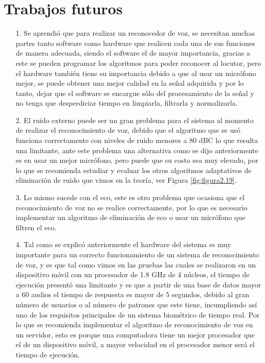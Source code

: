 \section{Trabajos futuros}
\begin{enumerate}
\item[1.]Se aprendió que para realizar un reconocedor de voz, se necesitan muchas partes tanto software como hardware que realicen cada una de sus funciones de manera adecuada, siendo el software el de mayor importancia, gracias a este se pueden programar los algoritmos para poder reconocer al locutor, pero el hardware también tiene su importancia debido a que al usar un micrófono mejor, se puede obtener una mejor calidad en la señal adquirida y por lo tanto, dejar que el software se encargue sólo del procesamiento de la señal y no tenga que desperdiciar tiempo en limpiarla, filtrarla y normalizarla.

\item[2.]El ruido externo puede ser un gran problema para el sistema al momento de realizar el reconocimiento de voz, debido que el algoritmo que se usó funciona correctamente con niveles de ruido menores a 80 dBC lo que resulta una limitante, ante este problema una alternativa como se dijo anteriormente es en usar un mejor micrófono, pero puede que su costo sea muy elevado, por lo que se recomienda estudiar y evaluar los otros algoritmos adaptativos de eliminación de ruido que vimos en la teoría, ver Figura \ref{fig:figura2.19}.

\item[3.]Lo mismo sucede con el eco, este es otro problema que ocasiona que el reconocimiento de voz no se realice correctamente, por lo que es necesario implementar un algoritmo de eliminación de eco o usar un micrófono que filtren el eco.

\item[4.]Tal como se explicó anteriormente el hardware del sistema es muy importante para un correcto funcionamiento de un sistema de reconocimiento de voz, y es que tal como vimos en las pruebas las cuales se realizaron en un dispositivo móvil con un procesador de 1.8 GHz de 4 núcleos, el tiempo de ejecución presentó una limitante y es que a partir de una base de datos mayor a 60 audios el tiempo de respuesta es mayor de 5 segundos, debido al gran número de usuarios o al número de patrones que este tiene, incumpliendo así uno de los requisitos principales de un sistema biométrico de tiempo real. 
\vskip 0.5cm
Por lo que se recomienda implementar el algoritmo de reconocimiento de voz en un servidor, esto es porque una computadora tiene un mejor procesador que el de un dispositivo móvil, a mayor velocidad en el procesador menor será el tiempo de ejecución.


\end{enumerate}

